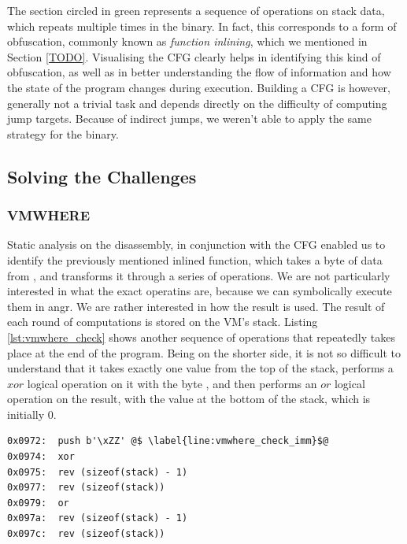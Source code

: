 The section circled in green represents a sequence of operations on stack data, which repeats multiple times in the binary. In fact, this corresponds to a form of obfuscation, commonly known as \emph{function inlining}, which we mentioned in Section \ref{TODO}. Visualising the \gls{CFG} clearly helps in identifying this kind of obfuscation, as well as in better understanding the flow of information and how the state of the program changes during execution. Building a \gls{CFG} is however, generally not a trivial task and depends directly on the difficulty of computing jump targets. Because of indirect jumps, we weren't able to apply the same strategy for the  binary.

\subsection{Solving the Challenges}

\subsubsection{VMWHERE}

Static analysis on the disassembly, in conjunction with the \gls{CFG} enabled us to identify the previously mentioned inlined function, which takes a byte of data from , and transforms it through a series of operations. We are not particularly interested in what the exact operatins are, because we can symbolically execute them in angr. We are rather interested in how the result is used. The result of each round of computations is stored on the \gls{VM}'s stack. Listing \ref{lst:vmwhere_check} shows another sequence of operations that repeatedly takes place at the end of the program. Being on the shorter side, it is not so difficult to understand that it takes exactly one value from the top of the stack, performs a $xor$ logical operation on it with the byte \cc{\xZZ}, and then performs an $or$ logical operation on the result, with the value at the bottom of the stack, which is initially $0$.

\begin{lstlisting}[label={lst:vmwhere_check}, caption={TODO}]
0x0972:  push b'\xZZ' @$ \label{line:vmwhere_check_imm}$@
0x0974:  xor
0x0975:  rev (sizeof(stack) - 1)
0x0977:  rev (sizeof(stack))
0x0979:  or
0x097a:  rev (sizeof(stack) - 1)
0x097c:  rev (sizeof(stack))
\end{lstlisting}

